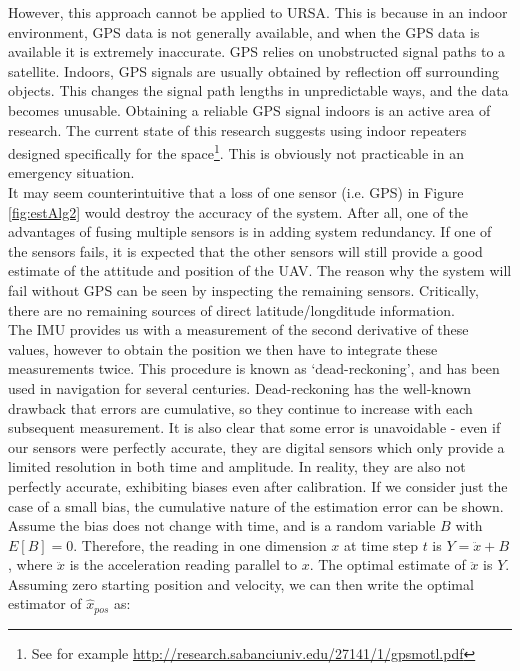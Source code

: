 \documentclass[capstone_report.tex]{subfiles}
\begin{document}
However, this approach cannot be applied to URSA. This is because in an indoor environment, GPS data is not generally available, and when the GPS data is available it is extremely inaccurate. GPS relies on unobstructed signal paths to a satellite. Indoors, GPS signals are usually obtained by reflection off surrounding objects. This changes the signal path lengths in unpredictable ways, and the data becomes unusable. Obtaining a reliable GPS signal indoors is an active area of research. The current state of this research suggests using indoor repeaters designed specifically for the space\footnote{See for example \url{http://research.sabanciuniv.edu/27141/1/gpsmotl.pdf}}. This is obviously not practicable in an emergency situation. \\

It may seem counterintuitive that a loss of one sensor (i.e. GPS) in Figure \ref{fig:estAlg2} would destroy the accuracy of the system. After all, one of the advantages of fusing multiple sensors is in adding system redundancy. If one of the sensors fails, it is expected that the other sensors will still provide a good estimate of the attitude and position of the UAV. The reason why the system will fail without GPS can be seen by inspecting the remaining sensors. Critically, there are no remaining sources of direct latitude/longditude information. \\

The IMU provides us with a measurement of the second derivative of these values, however to obtain the position we then have to integrate these measurements twice. This procedure is known as `dead-reckoning', and has been used in navigation for several centuries. Dead-reckoning has the well-known drawback that errors are cumulative, so they continue to increase with each subsequent measurement. It is also clear that some error is unavoidable - even if our sensors were perfectly accurate, they are digital sensors which only provide a limited resolution in both time and amplitude. In reality, they are also not perfectly accurate, exhibiting biases even after calibration. If we consider just the case of a small bias, the cumulative nature of the estimation error can be shown.\\ 

Assume the bias does not change with time, and is a random variable $B$ with $E[B]=0$. Therefore, the reading in one dimension $x$ at time step $t$ is $Y=\ddot{x}+B$, where $\ddot{x}$ is the acceleration reading parallel to $x$. The optimal estimate of $\ddot{x}$ is $Y$. Assuming zero starting position and velocity, we can then write the optimal estimator of $\hat{x}_{pos}$ as:
\end{document}
